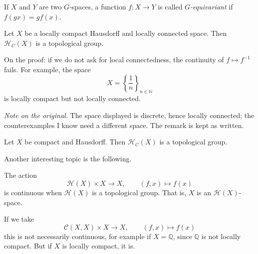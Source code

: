 \begin{definition}
\label{definition-equivariant}
If $X$ and $Y$ are two $G$-spaces, a
function $f:X\to Y$ is called
{\it $G$-equivariant} if
$f(gx)=gf(x)$.
\end{definition}

\begin{theorem}
\label{theorem-homeo-group-locally-compact}
Let $X$ be a locally compact Hausdorff
and locally connected space. Then
$\mathcal{H}_C(X)$ is a topological
group.
\end{theorem}

\begin{remark}
\label{remark-homeo-group-locally-connected}
On the proof: if we do not ask for
local connectedness, the continuity of
$f\mapsto f^{-1}$ fails. For example,
the space
$$
X=\left\{\frac{1}{n}
\right\}_{n\in\mathbb{N}}
$$
is locally compact but not locally
connected.
\end{remark}

\noindent
{\it Note on the original.} The space
displayed is discrete, hence locally
connected; the counterexamples I know
need a different space. The remark is
kept as written.

\begin{theorem}
\label{theorem-homeo-group-compact}
Let $X$ be compact and Hausdorff. Then
$\mathcal{H}_C(X)$ is a topological
group.
\end{theorem}

Another interesting topic is the
following.

\begin{theorem}
\label{theorem-evaluation-action}
The action
$$
\mathcal{H}(X)\times X\to X,
\qquad
(f,x)\mapsto f(x)
$$
is continuous when $\mathcal{H}(X)$ is
a topological group. That is, $X$ is an
$\mathcal{H}(X)$-space.
\end{theorem}

\begin{remark}
\label{remark-evaluation-not-continuous}
If we take
$$
\mathcal{C}(X,X)\times X\to X,
\qquad
(f,x)\mapsto f(x)
$$
this is not necessarily continuous, for
example if $X=\mathbb{Q}$, since
$\mathbb{Q}$ is not locally compact.
But if $X$ is locally compact, it is.
\end{remark}

